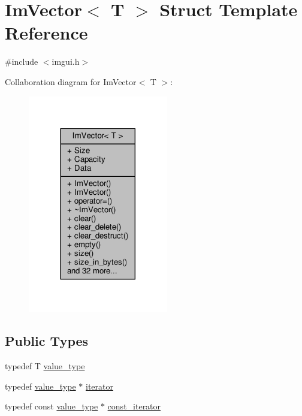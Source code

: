 \hypertarget{structImVector}{}\section{Im\+Vector$<$ T $>$ Struct Template Reference}
\label{structImVector}


{\ttfamily \#include $<$imgui.\+h$>$}



Collaboration diagram for Im\+Vector$<$ T $>$\+:
\nopagebreak
\begin{figure}[H]
\begin{center}
\leavevmode
\includegraphics[width=173pt]{structImVector__coll__graph}
\end{center}
\end{figure}
\subsection*{Public Types}
\begin{DoxyCompactItemize}
\item 
typedef T \hyperlink{structImVector_a8bd77e4e7581d8e5f9e98d7c2f3c2a80}{value\+\_\+type}
\item 
typedef \hyperlink{structImVector_a8bd77e4e7581d8e5f9e98d7c2f3c2a80}{value\+\_\+type} $\ast$ \hyperlink{structImVector_a74b5478f1f6fd471cc71219bce483db6}{iterator}
\item 
typedef const \hyperlink{structImVector_a8bd77e4e7581d8e5f9e98d7c2f3c2a80}{value\+\_\+type} $\ast$ \hyperlink{structImVector_aedeac9c5080f9d6ce96ae837768ee4c4}{const\+\_\+iterator}
\end{DoxyCompactItemize}
